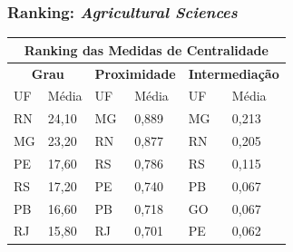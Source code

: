 \subsubsection{Ranking: \textit{Agricultural Sciences}}

\begin{table}[H]
	\centering
	\begin{tabular}{|l|l|l|l|l|l|}
		\hline
		\multicolumn{6}{|c|}{\textbf{Ranking das Medidas de Centralidade}}                                                                                                                                    \\ \hline
		\multicolumn{2}{|c|}{\cellcolor[HTML]{C0C0C0}\textbf{Grau}} & \multicolumn{2}{c|}{\cellcolor[HTML]{C0C0C0}\textbf{Proximidade}} & \multicolumn{2}{c|}{\cellcolor[HTML]{C0C0C0}\textbf{Intermediação}} \\ \hline
		UF                          & Média                         & UF                     & Média                                    & UF                              & Média                             \\ \hline
		RN                          & 24,10                         & MG                     & 0,889                                    & MG                              & 0,213                             \\ \hline
		MG                          & 23,20                         & RN                     & 0,877                                    & RN                              & 0,205                             \\ \hline
		PE                          & 17,60                         & RS                     & 0,786                                    & RS                              & 0,115                             \\ \hline
		RS                          & 17,20                         & PE                     & 0,740                                    & PB                              & 0,067                             \\ \hline
		PB                          & 16,60                         & PB                     & 0,718                                    & GO                              & 0,067                             \\ \hline
		RJ                          & 15,80                         & RJ                     & 0,701                                    & PE                              & 0,062                             \\ \hline

\end{tabular}
\end{table}
